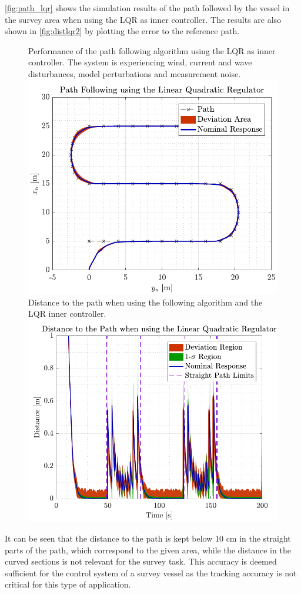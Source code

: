 \autoref{fig:path_lqr} shows the simulation results of the path followed by the vessel in the survey area when using the LQR as inner controller. The results are also shown in \autoref{fig:distlqr2} by plotting the error to the reference path.
\begin{figure}[H]
    \captionbox  
    {            
        Performance of the path following algorithm using the LQR as inner controller. The system is experiencing wind, current and wave disturbances, model perturbations and measurement noise.
        \label{fig:path_lqr}                               
    }                                                                
    {                                                                 
        \includegraphics[width=.45\textwidth]{figures/path_lqr}    
    }                                                                  
    \hspace{5pt}                                                        
    \captionbox 
    {       
        Distance to the path when using the following algorithm and the LQR inner controller.                                                                  %
        \label{fig:distlqr2}                                  
    }                                                                          
    {                                                                            
        \includegraphics[width=.45\textwidth]{figures/dist_lqr}          
    }                                                                            
\end{figure}
It can be seen that the distance to the path is kept below 10 cm in the straight parts of the path, which correspond to the given area, while the distance in the curved sections is not relevant for the survey task. This accuracy is deemed sufficient for the control system of a survey vessel as the tracking accuracy is not critical for this type of application.


